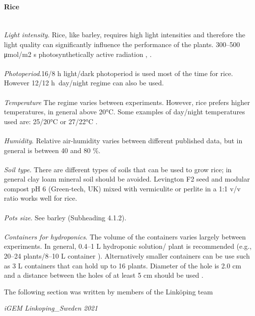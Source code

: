 \paragraph{Rice}\mbox{}  \\
\textit{Light intensity}. Rice, like barley, requires high light intensities and therefore the light quality can significantly influence the performance of the plants. 300–500 μmol/m2 s photosynthetically active radiation \parencite{Miyamoto2001}, \parencite{MartinezAtienza2006}. \\ \\
\textit{Photoperiod}.16/8 h light/dark photoperiod is used most of the time for rice. However 12/12 h  day/night regime can also be used. \\ \\
\textit{Temperature} The regime varies between experiments. However, rice prefers higher temperatures, in general above 20°C. Some examples of day/night temperatures used are: 25/20°C \parencite{MartinezAtienza2006} or 27/22°C \parencite{Miyamoto2001}.\\ \\
\textit{Humidity}. Relative air-humidity varies between different published data, but in general is between 40 and 80 \%. \\ \\
\textit{Soil type}. There are different types of soils that can be used to grow rice; in general clay loam mineral soil should be avoided. Levington F2 seed and modular compost pH 6 (Green-tech, UK) mixed with vermiculite or perlite in a 1:1 v/v ratio works well for rice. \\ \\
\textit{Pots size}. See barley (Subheading 4.1.2). \\ \\
\textit{Containers for hydroponics}. The volume of the containers varies largely between experiments. In general, 0.4–1 L hydroponic solution/ plant is recommended (e.g., 20–24 plants/8–10 L container \parencite{Miyamoto2001} \parencite{MartinezAtienza2006}). Alternatively smaller containers can be use such as 3 L containers that can hold up to 16 plants. Diameter of the hole is 2.0 cm and a distance between the holes of at least 5 cm should be used \parencite{Podar2012}.

\epigraph{The following section was written by members of the Linköping team}{\textit{iGEM Linkoping\_Sweden 2021}}
